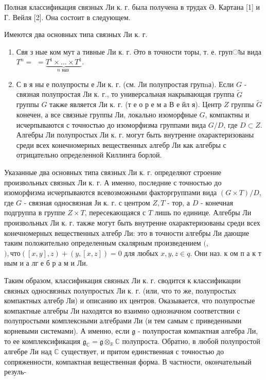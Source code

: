 \documentclass[10pt]{article}
\begin{document}
Полная классификация связных Ли к. г. была получена в трудах Ә. Картана [1] и Г. Вейля [2]. Она состоит в следующем.



Имеются два основных типа связных Ли к. г.



\begin{enumerate}

  \item Свя з ные ком мут а тивные Ли к. г. Әто в точности торы, т. е. групाы вида $T^{n}=$ $=\underbrace{T^{1} \times \ldots \times T^{1}}_{n \text { наз }}$.



  \item С в я ны е полупросты е Ли к. г. (см. Ли полупростая групnа). Если $G$ - связная полупростая Ли к. г., то универсальная накрывающая группа $\tilde{G}$ группы $G$ также является Ли к. г. (т е о р е м а В е йл я). Центр $Z$ группы $\tilde{G}$ конечен, а все связные группы Ли, локально изоморфные $G$, компактны и исчерпываются с точностью до изоморфизма группами вида $G / D$, где $D \subset Z$. Алгебры Ли полупростых Ли к. г. могут быть внутренне охарактеризованы среди всех конечномерных вещественных алгебр Ли как алгебры с отрицательно определенной Киллинга борлой.



\end{enumerate}



Указанные два основных типа связных Ли к. г. определяют строение произвольных связных Ли к. г. А именно, последние с точностью до изоморфизма исчерпываются всевозможными факторгруппами вида $(G \times T) / D$, где $G$ - связная односвязная Ји к. г. с центром $Z, T$ - тор, а $D$ - конечная подгруппа в группе $Z \times T$, пересекающаяся с $T$ лишь по единице. Алгебры Ли произвольных Ли к. г. также могут быть внутренне охарактеризованы среди всех конечномерных вещественных алгебр Ли: это в точности алгебры Ли дающие таким положительно определенным скалярным произведением $($,$) , что ([x, y], z)+(y,[x, z])=0$ для любых $x, y, z \in q$. Они наз. к ом п а к т ным и а лг е б р а м и Ли.



Таким образом, классификация связных Ли к. г. сводится к классификации связных односвязных полупростых Ли к. г. (или, что то же, полупростых компактных алгебр Ли) и описанию их центров. Оказывается, что полупростые компактные алгебры Ли находятся во взаимно однозначном соответствии с полупростыми комплексными алгебрами Ли (и тем самым с приведенными корневыми системами). А именно, если $\mathfrak{g}$ - полупростая компактная алгебра Ли, то ее комплексификация $\mathfrak{g}_{\mathbb{C}}=\mathfrak{g} \otimes_{\mathbb{R}} \mathbb{C}$ полупроста. Обратно, в любой полупростой алгебре Ли над $\mathbb{C}$ существует, и притом единственная с точностью до сопряженности, компактная вещественная форма. В частности, окончательный резуль-
\end{document}
